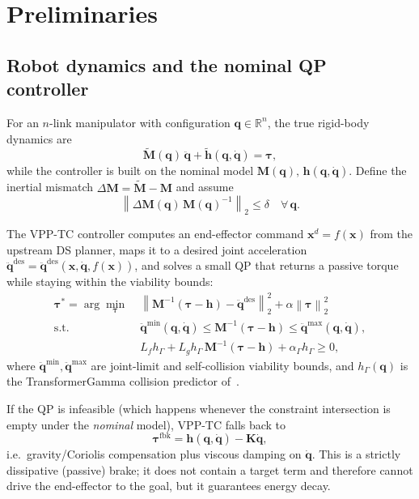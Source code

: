 \documentclass[10pt,conference]{IEEEtran}
\newcommand{\R}{\mathbb{R}}
\newcommand{\bx}{\bm{x}}
\newcommand{\bq}{\bm{q}}
\newcommand{\bdq}{\dot{\bm{q}}}
\newcommand{\bddq}{\ddot{\bm{q}}}
\newcommand{\btau}{\bm{\tau}}
\newcommand{\bM}{\bm{M}}
\newcommand{\bMt}{\widetilde{\bm{M}}}
\newcommand{\bh}{\bm{h}}
\newcommand{\bht}{\widetilde{\bm{h}}}
\newcommand{\norm}[1]{\left\lVert #1 \right\rVert}
\theoremstyle{remark}
\theoremstyle{plain}
\begin{document}
\section{Preliminaries}
\label{sec:back}

\subsection{Robot dynamics and the nominal QP controller}
For an $n$-link manipulator with configuration $\bq\in\R^n$, the
true rigid-body dynamics are
\begin{equation}
    \bMt(\bq)\,\bddq + \bht(\bq,\bdq) = \btau,
    \label{eq:dyn-true}
\end{equation}
while the controller is built on the nominal model
$\bM(\bq),\,\bh(\bq,\bdq)$. Define the inertial mismatch
$\Delta\bM = \bMt - \bM$ and assume
\begin{equation}
    \norm{\Delta\bM(\bq)\,\bM(\bq)^{-1}}_2 \le \delta
    \quad \forall\,\bq.
    \label{eq:delta-bound}
\end{equation}

The VPP-TC controller computes an end-effector command
$\bx^d=f(\bx)$ from the upstream DS planner, maps it to a desired
joint acceleration $\bddq^{\text{des}} = \bddq^{\text{des}}(\bx,
\bdq, f(\bx))$, and solves a small QP that returns a passive
torque while staying within the viability bounds:
\begin{equation}
\begin{aligned}
\btau^* = \arg\min_{\btau}\;
    & \norm{\bM^{-1}(\btau-\bh) - \bddq^{\text{des}}}_2^2
      + \alpha\norm{\btau}_2^2 \\
\text{s.t.}\quad
    & \bddq^{\min}(\bq,\bdq) \le \bM^{-1}(\btau-\bh)
                            \le \bddq^{\max}(\bq,\bdq), \\
    & L_f h_{\Gamma} + L_g h_{\Gamma}\,\bM^{-1}(\btau-\bh)
                            + \alpha_{\Gamma} h_{\Gamma} \ge 0,
\end{aligned}
\label{eq:vpptc-qp}
\end{equation}
where $\bddq^{\min},\bddq^{\max}$ are joint-limit and
self-collision viability bounds, and $h_\Gamma(\bq)$ is the
TransformerGamma collision predictor of~\cite{zhang2025vpptc}.

If the QP is infeasible (which happens whenever the constraint
intersection is empty under the \emph{nominal} model), VPP-TC
falls back to
\begin{equation}
    \btau^{\text{fbk}} = \bh(\bq,\bdq) - \bm{K}\bdq,
    \label{eq:fallback}
\end{equation}
i.e.\ gravity/Coriolis compensation plus viscous damping on $\bdq$.
This is a strictly dissipative (passive) brake; it does not
contain a target term and therefore cannot drive the end-effector
to the goal, but it guarantees energy decay.
\end{document}
